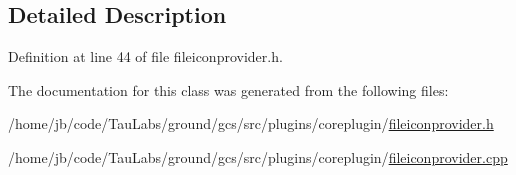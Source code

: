 \subsection{\-Detailed \-Description}


\-Definition at line 44 of file fileiconprovider.\-h.



\-The documentation for this class was generated from the following files\-:\begin{DoxyCompactItemize}
\item 
/home/jb/code/\-Tau\-Labs/ground/gcs/src/plugins/coreplugin/\hyperlink{fileiconprovider_8h}{fileiconprovider.\-h}\item 
/home/jb/code/\-Tau\-Labs/ground/gcs/src/plugins/coreplugin/\hyperlink{fileiconprovider_8cpp}{fileiconprovider.\-cpp}\end{DoxyCompactItemize}
